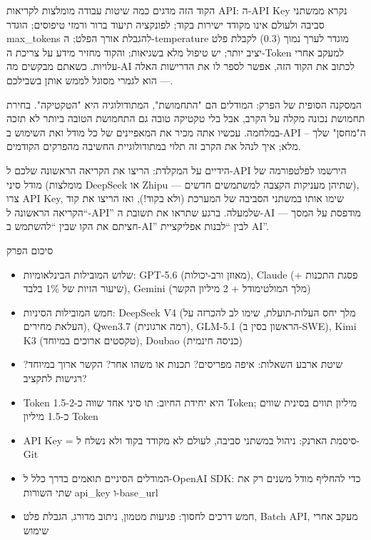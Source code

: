 הקוד הזה מדגים כמה שיטות עבודה מומלצות לקריאות API: ה-API Key נקרא ממשתני סביבה ולעולם אינו מקודד ישירות בקוד; לפונקציה תיעוד ברור ורמזי טיפוסים; הוגדר max\_tokens להגבלת אורך הפלט; ה-temperature מוגדר לערך נמוך (0.3) לקבלת פלט יציב יותר; יש טיפול מלא בשגיאות; והקוד מחזיר מידע על צריכת ה-Token למעקב אחרי עלויות. כשאתם מבקשים מה-AI לכתוב את הקוד הזה, אפשר לספר לו את הדרישות האלה — הוא לגמרי מסוגל לממש אותן בשבילכם.

המסקנה הסופית של הפרק: המודלים הם "התחמושת", המתודולוגיה היא "הטקטיקה". בחירת תחמושת נכונה מקלה על הקרב, אבל בלי טקטיקה טובה גם התחמושת הטובה ביותר לא תזכה במלחמה. עכשיו אתה מכיר את המאפיינים של כל מודל ואת השימוש ב-API – ה"מחסן" שלך מלא; איך לנהל את הקרב זה תלוי במתודולוגיית החשיבה מהפרקים הקודמים.

\begin{tcbpractice}{הידיים על המקלדת: הריצו את הקריאה הראשונה שלכם ל-API}
הירשמו לפלטפורמה של מודל סיני (מומלצות DeepSeek או Zhipu — שתיהן מעניקות הקצבה למשתמשים חדשים), צרו API Key, שימו אותו במשתני הסביבה של המערכת (ולא בקוד!), ואז הריצו את קוד “הקריאה הראשונה ל-API” שלמעלה. ברגע שתראו את תשובת ה-AI מודפסת על המסך — חציתם את הקו שבין “להשתמש ב-AI” לבין “לבנות אפליקציית AI”.

\end{tcbpractice}

\begin{tcbsummary}{סיכום הפרק}
\begin{itemize}
  \item שלוש המובילות הבינלאומיות: GPT-5.6 (מאוזן ורב-יכולות), Claude (פסגת התכנות + שיעור הזיות של 1\% בלבד), Gemini (מלך המולטימודל + 2 מיליון הקשר)
  \item חמש המובילות הסיניות: DeepSeek V4 (מלך יחס העלות-תועלת, שימו לב להכרזה על העלאת מחירים), Qwen3.7 (רמה ארגונית), GLM-5.1 (הראשון בסין ב-SWE), Kimi K3 (טקסטים ארוכים במיוחד), Doubao (כניסה חינמית)
  \item שיטת ארבע השאלות: איפה מפריסים? תכנות או משהו אחר? הקשר ארוך במיוחד? רגישות לתקציב?
  \item Token היא יחידת החיוב: תו סיני אחד שווה כ-1.5-2 Token; מיליון תווים בסינית שווים כ-1.5 מיליון Token
  \item API Key = סיסמת הארנק: ניהול במשתני סביבה, לעולם לא מקודד בקוד ולא נשלח ל-Git
  \item המודלים הסיניים תואמים בדרך כלל ל-OpenAI SDK: כדי להחליף מודל משנים רק את שתי השורות api\_key ו-base\_url
  \item חמש דרכים לחסוך: פגיעות מטמון, ניתוב מדורג, הגבלת פלט, Batch API, מעקב אחרי שימוש
\end{itemize}

\end{tcbsummary}
